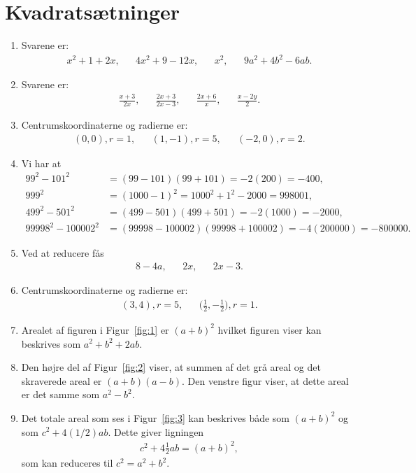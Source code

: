 \newpage
\section{Kvadratsætninger}
\begin{enumerate}
\item Svarene er:
\begin{align*}
x^2+1+2x,&& 4x^2+9-12x,&& x^2,&& 9a^2+4b^2-6ab.
\end{align*}
\item Svarene er:
\begin{align*}
\frac{x+3}{2x},&& \frac{2x+3}{2x-3},&& \frac{2x+6}{x},&& \frac{x-2y}{2}.
\end{align*}
\item Centrumskoordinaterne og radierne er:
\begin{align*}
(0,0), r=1,&& (1,-1), r=5,&& (-2,0), r=2.
\end{align*}
\item Vi har at
\begin{align*}
99^2-101^2&=(99-101)(99+101)=-2(200)=-400,\\
999^2&=(1000-1)^2=1000^2+1^2-2000= 998001,\\
499^2-501^2&=(499-501)(499+501)=-2(1000)= -2000,\\ 
99998^2-100002^2&=(99998-100002)(99998+100002)=-4(200000)=-800000.
\end{align*}
\item Ved at reducere fås
\begin{align*}
8-4a,&& 2x,&&2x-3.
\end{align*}
\item Centrumskoordinaterne og radierne er:
\begin{align*}
(3,4),r=5,&& \Big( \frac{1}{2},-\frac{1}{2}\Big), r=1.
\end{align*}
\item \label{it:1ans} Arealet af figuren i Figur~\ref{fig:1} er $(a+b)^2$ hvilket figuren viser kan beskrives som $a^2+b^2+2ab$.
\item \label{it:2ans} Den højre del af Figur~\ref{fig:2} viser, at summen af det grå areal og det skraverede areal er $(a+b)(a-b)$. Den venstre figur viser, at dette areal er det samme som $a^2-b^2$.
\item \label{it:3ans} Det totale areal som ses i Figur~\ref{fig:3} kan beskrives både som $(a+b)^2$ og som $c^2+4( 1/2) ab$. Dette giver ligningen
\begin{align*}
c^2+4 \frac{1}{2}ab=(a+b)^2,
\end{align*}
som kan reduceres til $c^2=a^2+b^2$.


\end{enumerate}
